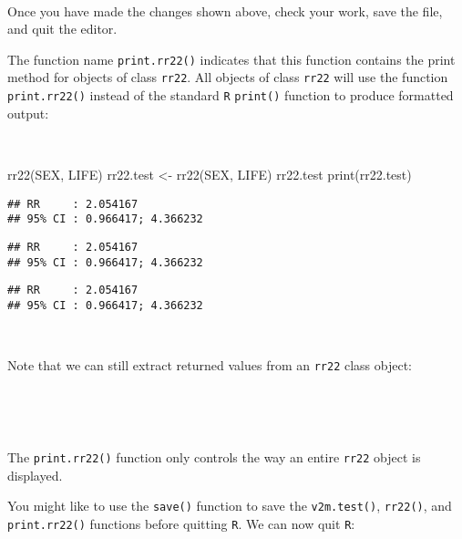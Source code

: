 \documentclass[
  12pt,
  a4paper]{book}
\newenvironment{Shaded}{\begin{snugshade}}{\end{snugshade}}
\newcommand{\FunctionTok}[1]{\textcolor[rgb]{0.00,0.00,0.00}{#1}}
\newcommand{\NormalTok}[1]{#1}
\newcommand{\OtherTok}[1]{\textcolor[rgb]{0.56,0.35,0.01}{#1}}
\newcommand{\SpecialCharTok}[1]{\textcolor[rgb]{0.00,0.00,0.00}{#1}}
\begin{document}
~

Once you have made the changes shown above, check your work, save the file, and quit the editor.

The function name \texttt{print.rr22()} indicates that this function contains the print method for objects of class \texttt{rr22}. All objects of class \texttt{rr22} will use the function \texttt{print.rr22()} instead of the standard \texttt{R} \texttt{print()} function to produce formatted output:

~

\begin{Shaded}
\begin{Highlighting}[]
\FunctionTok{rr22}\NormalTok{(SEX, LIFE)}
\NormalTok{rr22.test }\OtherTok{\textless{}{-}} \FunctionTok{rr22}\NormalTok{(SEX, LIFE)}
\NormalTok{rr22.test}
\FunctionTok{print}\NormalTok{(rr22.test)}
\end{Highlighting}
\end{Shaded}

\begin{verbatim}
## RR     : 2.054167
## 95% CI : 0.966417; 4.366232
\end{verbatim}

\begin{verbatim}
## RR     : 2.054167
## 95% CI : 0.966417; 4.366232
\end{verbatim}

\begin{verbatim}
## RR     : 2.054167
## 95% CI : 0.966417; 4.366232
\end{verbatim}

~

Note that we can still extract returned values from an \texttt{rr22} class object:

~

\begin{Shaded}
\end{Shaded}

~

The \texttt{print.rr22()} function only controls the way an entire \texttt{rr22} object is displayed.

You might like to use the \texttt{save()} function to save the \texttt{v2m.test()}, \texttt{rr22()}, and \texttt{print.rr22()} functions before quitting \texttt{R}. We can now quit \texttt{R}:
\end{document}
